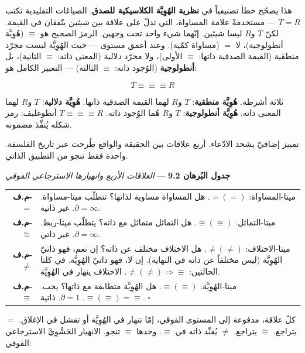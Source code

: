 \documentclass[10pt, openany, oneside]{book}
\renewcommand{\footnotesize}{\fontsize{8.5}{11}\selectfont}
\begin{document}
هذا يصحّح خطأ تصنيفياً في \textbf{نظرية الهُوِيَّة الكلاسيكية للصدق}. الصياغات التقليدية تكتب $T = R$ --- مستخدمةً علامة المساواة، التي تدلّ على علاقة بين \textit{شيئين} يتّفقان في القيمة. لكنّ $T$ و$R$ ليسا شيئين. إنّهما شيء واحد تحت وجهين. الرمز الصحيح هو $\equiv$ (هُوِيَّة أنطولوجية)، لا $=$ (مساواة كمّية). وعند أعمق مستوى --- حيث الهُوِيَّة ليست مجرّد منطقية (القيمة الصدقية ذاتها: $\equiv$ الأولى)، ولا مجرّد دلالية (المعنى ذاته: $\equiv$ الثانية)، بل \textbf{أنطولوجية} (الوُجود ذاته: $\equiv$ الثالثة) --- التعبير الكامل هو:

$$T \equiv\!\equiv\!\equiv R$$

ثلاثة أشرطة. \textbf{هُوِيَّة منطقية}: $T$ و$R$ لهما القيمة الصدقية ذاتها. \textbf{هُوِيَّة دلالية}: $T$ و$R$ لهما المعنى ذاته. \textbf{هُوِيَّة أنطولوجية}: $T$ و$R$ هُما الوُجود ذاته. $T \equiv\!\equiv\!\equiv R$ أنطوغليف: رمز شكله يُنفِّذ مضمونه.

تمييز إضافيّ يشحذ الادّعاء. أربع علاقات بين الحقيقة والواقع طُرحت عبر تاريخ الفلسفة. واحدة فقط تنجو من التطبيق الذاتي.

\vspace{0.5em}

\textbf{جدول البُرهان 9.2} --- \textit{العلاقات الأربع وانهيارها الاسترجاعي الفوقي}

\vspace{0.5em}

{\footnotesize
\noindent\begin{tabular}{r p{}}
\textbf{م.ف-$=$} & ميتا-المساواة: $=(=)$. هل المساواة مساوية لذاتها؟ تتطلّب ميتا-مساواة. $\partial = \infty$. غير ذاتية. \\[0.3em]
\textbf{م.ف-$\cong$} & ميتا-التماثل: $\cong(\cong)$. هل التماثل متماثل مع ذاته؟ يتطلّب ميتا-ربط. $\partial = \infty$. غير ذاتي. \\[0.3em]
\textbf{م.ف-$\neq$} & ميتا-الاختلاف: $\neq(\neq)$. هل الاختلاف مختلف عن ذاته؟ إن نعم، فهو ذاتيّ الهُوِيَّة (ليس مختلفاً عن ذاته في النهاية). إن لا، فهو ذاتيّ الهُوِيَّة. في كلتا الحالتين: $\neq(\neq) \Rightarrow \equiv$. الاختلاف ينهار في الهُوِيَّة. \\[0.3em]
\textbf{م.ف-$\equiv$} & ميتا-الهُوِيَّة: $\equiv(\equiv)$. هل الهُوِيَّة متطابقة مع ذاتها؟ يجب. $\equiv(\equiv) = \equiv$. $\partial = 1$. ذاتية. $\square$ \\[0.3em]
\end{tabular}
}

\vspace{0.8em}

\noindent كلّ علاقة، مدفوعة إلى المستوى الفوقي، إمّا تنهار في الهُوِيَّة أو تفشل في الإغلاق. $=$ يتراجع. $\cong$ يتراجع. $\neq$ يُفنِّد ذاته في $\equiv$. وحدها $\equiv$ تنجو. الانهيار الحَشْوِيَّ الاسترجاعي الفوقي:
\end{document}
